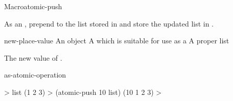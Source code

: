 \begin{functiondoc}{Macro}{atomic-push}{ \returns{}
    }
%

\fnsyntax

\fnpurpose As an , prepend  to the
list stored in  and store the updated list in
.

\fnpackage {}

\fnmodule {}

\fnargs
\begin{args}{new-place-value}
\arg[item] An object
\arg[place] A  which is suitable for use as a
 A proper list
\end{args}

\fnreturns The new value of . 

\begin{alsos}{as-atomic-operation}
\end{alsos}

\fnexample
%
\W\supp
\begin{example}
  > list
  (1 2 3)
  > (atomic-push 10 list)
  (10 1 2 3)
  >
\end{example}

\end{functiondoc}


